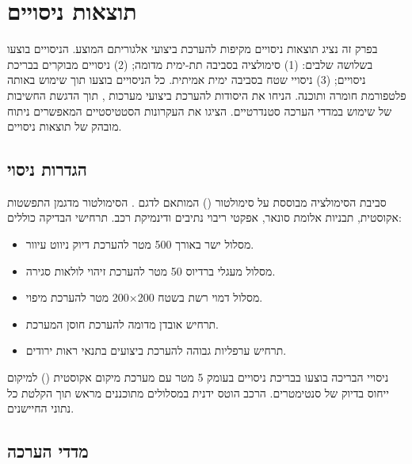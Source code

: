
\section{תוצאות ניסויים}
\label{sec:results}

בפרק זה נציג תוצאות ניסויים מקיפות להערכת ביצועי אלגוריתם  המוצע. הניסויים בוצעו בשלושה שלבים: (1) סימולציה בסביבה תת-ימית מדומה; (2) ניסויים מבוקרים בבריכת ניסויים; (3) ניסויי שטח בסביבה ימית אמיתית. כל הניסויים בוצעו תוך שימוש באותה פלטפורמת חומרה ותוכנה. \citet{Thrun2005ProbRobotics} הניחו את היסודות להערכת ביצועי מערכות , תוך הדגשת החשיבות של שימוש במדדי הערכה סטנדרטיים. \citet{Kalman1960} הציגו את העקרונות הסטטיסטיים המאפשרים ניתוח מובהק של תוצאות ניסויים.

\subsection{הגדרות ניסוי}
\label{sec:experimental_setup}

סביבת הסימולציה מבוססת על סימולטור  () המותאם לדגם . הסימולטור מדגמן התפשטות אקוסטית, תבניות אלומת סונאר, אפקטי ריבוי נתיבים ודינמיקת רכב. תרחישי הבדיקה כוללים:

\begin{itemize}
    \item מסלול ישר באורך 500 מטר להערכת דיוק ניווט עיוור.
    \item מסלול מעגלי ברדיוס 50 מטר להערכת זיהוי לולאות סגירה.
    \item מסלול דמוי רשת בשטח 200×200 מטר להערכת מיפוי.
    \item תרחיש אובדן  מדומה להערכת חוסן המערכת.
    \item תרחיש ערפליות גבוהה להערכת ביצועים בתנאי ראות ירודים.
\end{itemize}

ניסויי הבריכה בוצעו בבריכת ניסויים בעומק 5 מטר עם מערכת מיקום אקוסטית () למיקום ייחוס בדיוק של סנטימטרים. הרכב הוטס ידנית במסלולים מתוכננים מראש תוך הקלטת כל נתוני החיישנים.

\subsection{מדדי הערכה}
\label{sec:evaluation_metrics}

